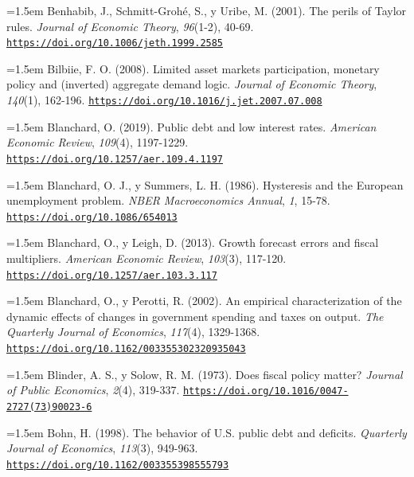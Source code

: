 \documentclass[10pt,a4paper]{article}
\begin{document}
\noindent\hangindent=1.5em Benhabib, J., Schmitt-Grohé, S., y Uribe, M. (2001). The perils of Taylor rules. \textit{Journal of Economic Theory}, \textit{96}(1-2), 40-69. \href{https://doi.org/10.1006/jeth.1999.2585}{\nolinkurl{https://doi.org/10.1006/jeth.1999.2585}}

\noindent\hangindent=1.5em Bilbiie, F. O. (2008). Limited asset markets participation, monetary policy and (inverted) aggregate demand logic. \textit{Journal of Economic Theory}, \textit{140}(1), 162-196. \href{https://doi.org/10.1016/j.jet.2007.07.008}{\nolinkurl{https://doi.org/10.1016/j.jet.2007.07.008}}

\noindent\hangindent=1.5em Blanchard, O. (2019). Public debt and low interest rates. \textit{American Economic Review}, \textit{109}(4), 1197-1229. \href{https://doi.org/10.1257/aer.109.4.1197}{\nolinkurl{https://doi.org/10.1257/aer.109.4.1197}}

\noindent\hangindent=1.5em Blanchard, O. J., y Summers, L. H. (1986). Hysteresis and the European unemployment problem. \textit{NBER Macroeconomics Annual}, \textit{1}, 15-78. \href{https://doi.org/10.1086/654013}{\nolinkurl{https://doi.org/10.1086/654013}}

\noindent\hangindent=1.5em Blanchard, O., y Leigh, D. (2013). Growth forecast errors and fiscal multipliers. \textit{American Economic Review}, \textit{103}(3), 117-120. \href{https://doi.org/10.1257/aer.103.3.117}{\nolinkurl{https://doi.org/10.1257/aer.103.3.117}}

\noindent\hangindent=1.5em Blanchard, O., y Perotti, R. (2002). An empirical characterization of the dynamic effects of changes in government spending and taxes on output. \textit{The Quarterly Journal of Economics}, \textit{117}(4), 1329-1368. \href{https://doi.org/10.1162/003355302320935043}{\nolinkurl{https://doi.org/10.1162/003355302320935043}}

\noindent\hangindent=1.5em Blinder, A. S., y Solow, R. M. (1973). Does fiscal policy matter? \textit{Journal of Public Economics}, \textit{2}(4), 319-337. \href{https://doi.org/10.1016/0047-2727(73)90023-6}{\nolinkurl{https://doi.org/10.1016/0047-2727(73)90023-6}}

\noindent\hangindent=1.5em Bohn, H. (1998). The behavior of U.S. public debt and deficits. \textit{Quarterly Journal of Economics}, \textit{113}(3), 949-963. \href{https://doi.org/10.1162/003355398555793}{\nolinkurl{https://doi.org/10.1162/003355398555793}}
\end{document}
